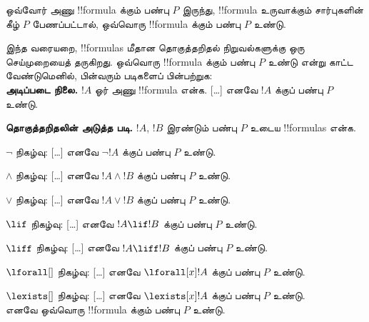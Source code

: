 \documentclass[../../../include/open-logic-section]{subfiles}
\begin{document}
\begin{defn}[!!{formula}s மீது தொகுத்தறிதல்]
ஒவ்வோர் அணு !!{formula} க்கும் பண்பு $P$ இருந்து,
!!{formula} உருவாக்கும் சார்புகளின் கீழ் $P$ பேணப்பட்டால்,
ஒவ்வொரு !!{formula} க்கும் பண்பு $P$ உண்டு.
\end{defn}

\begin{explain}
இந்த வரையறை, !!{formula}s மீதான தொகுத்தறிதல் நிறுவல்களுக்கு
ஒரு செய்முறையைத் தருகிறது. ஒவ்வொரு !!{formula} க்கும்
பண்பு $P$ உண்டு என்று காட்ட வேண்டுமெனில், பின்வரும்
படிகளைப் பின்பற்றுக:\\

\textbf{அடிப்படை நிலை.} $!A$ ஓர் அணு !!{formula} என்க.
[\ldots] எனவே $!A$ க்குப் பண்பு $P$ உண்டு.

\textbf{தொகுத்தறிதலின் அடுத்த படி.} $!A$, $!B$ இரண்டும்
பண்பு $P$ உடைய !!{formula}s என்க.

$\lnot$ நிகழ்வு: [\ldots] எனவே $\lnot !A$ க்குப் பண்பு $P$ உண்டு.

$\land$ நிகழ்வு: [\ldots] எனவே $!A \land !B$ க்குப் பண்பு $P$ உண்டு.

$\lor$ நிகழ்வு: [\ldots] எனவே $!A \lor !B$ க்குப் பண்பு $P$ உண்டு.

$\lif$ நிகழ்வு: [\ldots] எனவே $!A \lif !B$ க்குப் பண்பு $P$ உண்டு.

$\liff$ நிகழ்வு: [\ldots] எனவே $!A \liff !B$ க்குப் பண்பு $P$ உண்டு.

$\lforall[]$ நிகழ்வு: [\ldots] எனவே $\lforall[x] !A$ க்குப் பண்பு $P$ உண்டு.

$\lexists[]$ நிகழ்வு: [\ldots] எனவே $\lexists[x] !A$ க்குப் பண்பு $P$ உண்டு. \\

எனவே ஒவ்வொரு !!{formula} க்கும் பண்பு $P$ உண்டு.
\end{explain}
\end{document}
